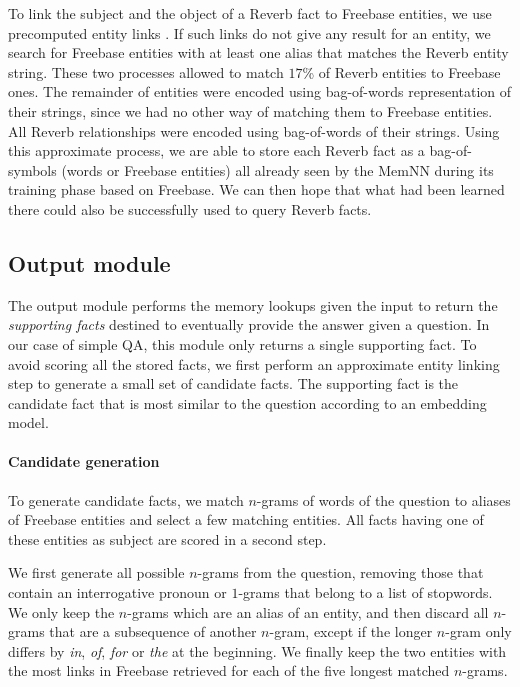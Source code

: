 \documentclass[11pt,a4paper]{article}
\newcommand{\fb}{{\sf Freebase}\xspace}
\newcommand{\rv}{{\sf Reverb}\xspace}
\begin{document}
To link the subject and the object of a \rv fact to \fb entities, we
use precomputed entity
links \cite{lin2012entity}. If such links do not give any result for an
entity, we search for \fb entities with at least one alias that
matches the \rv entity string. These two processes allowed to match
$17$\% of \rv entities to \fb ones. The remainder of entities were
encoded using bag-of-words representation of their strings, since we
had no other way of matching them to \fb entities.
All \rv relationships were encoded using bag-of-words of
their strings.
Using this approximate process, we are able to store each \rv fact as
a bag-of-symbols (words or \fb entities) all already seen by the MemNN
during its training phase based on \fb.
We can then hope that what had been learned there could also be
successfully used to query \rv facts.



\subsection{Output module}
\label{sec:outputModule}
The output module performs the memory lookups given the input to
return the {\it supporting facts} destined to eventually provide the
answer given a question.
In our case of simple QA, this module only returns a single supporting fact.
To avoid scoring all the stored
facts, we first perform an approximate entity linking step to generate
a small set of candidate facts. The supporting fact is the candidate fact that
is most similar to the question according to an embedding model.

\paragraph{Candidate generation}
To generate candidate facts, we match $n$-grams of words of the question to
aliases of \fb entities and select a few matching entities. All facts
having one of these entities as subject are scored in a second step.

We first generate all possible $n$-grams from the question, removing
those that contain an interrogative pronoun or $1$-grams
that belong to a list of stopwords. We only keep the $n$-grams which
are an alias of an entity, and then discard all $n$-grams that are a
subsequence of another $n$-gram, except if the longer $n$-gram only
differs by {\it in}, {\it of}, {\it for} or {\it the} at the
beginning. We finally keep the two entities with the most links in \fb
retrieved for each of the five longest matched $n$-grams.
\end{document}
